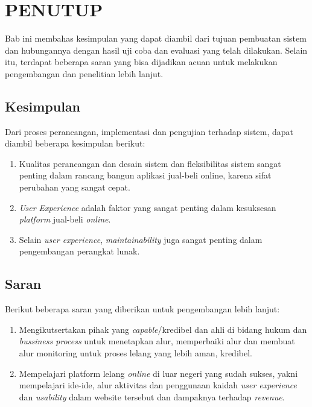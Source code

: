 \chapter{PENUTUP}
  Bab ini membahas kesimpulan yang dapat diambil dari tujuan pembuatan sistem dan hubungannya dengan hasil uji coba dan evaluasi yang telah dilakukan. Selain itu, terdapat beberapa saran yang bisa dijadikan acuan untuk melakukan pengembangan dan penelitian lebih lanjut.
  \section{Kesimpulan}
  Dari proses perancangan, implementasi dan pengujian terhadap sistem, dapat diambil beberapa kesimpulan berikut:
  \begin{enumerate}
    \item Kualitas perancangan dan desain sistem dan fleksibilitas sistem sangat penting dalam rancang bangun aplikasi jual-beli online, karena sifat perubahan yang sangat cepat.
    \item \textit{User Experience} adalah faktor yang sangat penting dalam kesuksesan \textit{platform} jual-beli \textit{online}.
    \item Selain \textit{user experience}, \textit{maintainability} juga sangat penting dalam pengembangan perangkat lunak.
  \end{enumerate}
  
  \section{Saran}
  Berikut beberapa saran yang diberikan untuk pengembangan lebih lanjut:
  \begin{enumerate}
    \item Mengikutsertakan pihak yang \textit{capable}/kredibel dan ahli di bidang hukum dan \textit{bussiness process} untuk menetapkan alur, memperbaiki alur dan membuat alur monitoring untuk proses lelang yang lebih aman, kredibel.
    \item Mempelajari platform lelang \textit{online} di luar negeri yang sudah sukses, yakni mempelajari ide-ide, alur aktivitas dan penggunaan kaidah \textit{user experience} dan \textit{usability} dalam website tersebut dan dampaknya terhadap \textit{revenue}.
  \end{enumerate}
  
